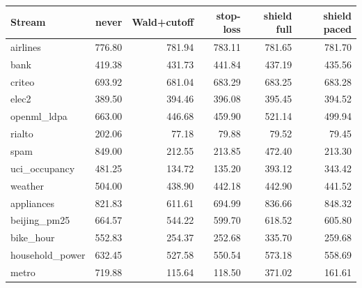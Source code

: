 \begin{tabular}{@{}l r r r r r @{}}
\toprule
Stream & never & Wald+cutoff & stop-loss & shield full & shield paced \\
\midrule
airlines & 776.80 & 781.94 & 783.11 & 781.65 & 781.70 \\
bank & 419.38 & 431.73 & 441.84 & 437.19 & 435.56 \\
criteo & 693.92 & 681.04 & 683.29 & 683.25 & 683.28 \\
elec2 & 389.50 & 394.46 & 396.08 & 395.45 & 394.52 \\
openml\_ldpa & 663.00 & 446.68 & 459.90 & 521.14 & 499.94 \\
rialto & 202.06 & 77.18 & 79.88 & 79.52 & 79.45 \\
spam & 849.00 & 212.55 & 213.85 & 472.40 & 213.30 \\
uci\_occupancy & 481.25 & 134.72 & 135.20 & 393.12 & 343.42 \\
weather & 504.00 & 438.90 & 442.18 & 442.90 & 441.52 \\
appliances & 821.83 & 611.61 & 694.99 & 836.66 & 848.32 \\
beijing\_pm25 & 664.57 & 544.22 & 599.70 & 618.52 & 605.80 \\
bike\_hour & 552.83 & 254.37 & 252.68 & 335.70 & 259.68 \\
household\_power & 632.45 & 527.58 & 550.54 & 573.18 & 558.69 \\
metro & 719.88 & 115.64 & 118.50 & 371.02 & 161.61 \\
\bottomrule
\end{tabular}
